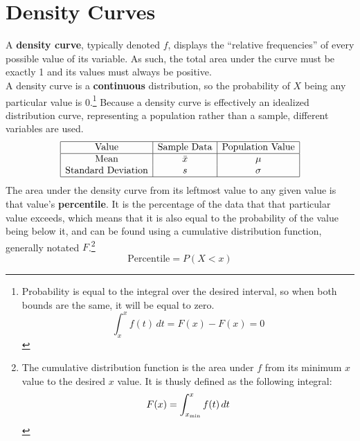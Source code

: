 \documentclass[../AP_Statistics.tex]{subfiles}
\begin{document}
		\section{Density Curves}
			A \textbf{density curve}, typically denoted $f$, displays the \enquote{relative frequencies} of every possible value of its variable. As such, the total area under the curve must be exactly 1 and its values must always be positive. \\ 
			A density curve is a \textbf{continuous} distribution, so the probability of $X$ being any particular value is 0.\footnote{Probability is equal to the integral over the desired interval, so when both bounds are the same, it will be equal to zero.$$\int_x^xf(t)\,dt = F(x) - F(x) = 0$$}
			Because a density curve is effectively an idealized distribution curve, representing a population rather than a sample, different variables are used. \\ 
			$$\begin{array}{|c|c|c|}\hline
				\rm{Value} & \text{Sample Data} & \text{Population Value} \\\hline
				\rm{Mean} & \bar{x} & \mu \\
				\text{Standard Deviation} & s & \sigma \\\hline
			\end{array}$$
			The area under the density curve from its leftmost value to any given value is that value's \textbf{percentile}. It is the percentage of the data that that particular value exceeds, which means that it is also equal to the probability of the value being below it, and can be found using a cumulative distribution function, generally notated $F$.\footnote{The cumulative distribution function is the area under $f$ from its minimum $x$ value to the desired $x$ value. It is thusly defined as the following integral:$$F(x) = \int_{x_{\mathrm{min}}}^xf(t)\,dt$$}
			$$\mathrm{Percentile} = P(X < x)$$
\end{document}
